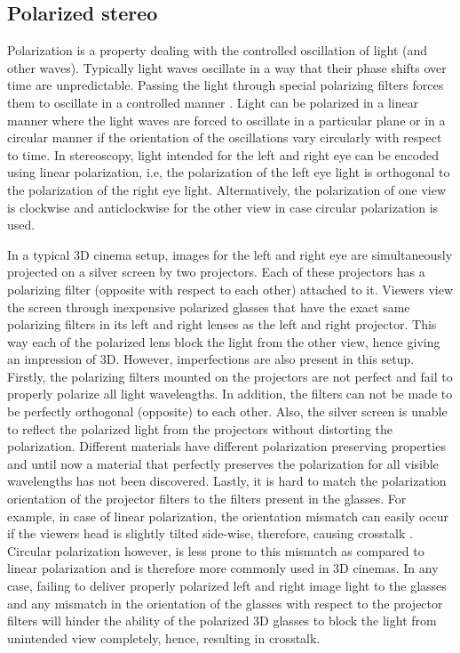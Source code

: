 \subsection{Polarized stereo}
Polarization is a property dealing with the controlled oscillation of light (and other waves). Typically light waves oscillate in a way that their phase shifts over time are unpredictable. Passing the light through special polarizing filters forces them to oscillate in a controlled manner \cite{ wiki:polarizationwiki}. Light can be polarized in a linear manner where the light waves are forced to oscillate in a particular plane or in a circular manner if the orientation of the oscillations vary circularly with respect to time. In stereoscopy, light intended for the left and right eye can be encoded using linear polarization, i.e, the polarization of the left eye light is orthogonal to the polarization of the right eye light. Alternatively, the polarization of one view is clockwise and anticlockwise for the other view in case circular polarization is used.

In a typical 3D cinema setup, images for the left and right eye are simultaneously projected on a silver screen by two projectors. Each of these projectors has a polarizing filter (opposite with respect to each other) attached to it. Viewers view the screen through inexpensive polarized glasses that have the exact same polarizing filters in its left and right lenses as the left and right projector. This way each of the polarized lens block the light from the other view, hence giving an impression of 3D. However, imperfections are also present in this setup. Firstly, the polarizing filters mounted on the projectors are not perfect and fail to properly polarize all light wavelengths. In addition, the filters can not be made to be perfectly orthogonal (opposite) to each other\cite{woods2012crosstalk}. Also, the silver screen is unable to reflect the polarized light from the projectors without distorting the polarization. Different materials have different polarization preserving properties and until now a material that perfectly preserves the polarization for all visible wavelengths has not been discovered. Lastly, it is hard to match the polarization orientation of the projector filters to the filters present in the glasses. For example, in case of linear polarization, the orientation mismatch can easily occur if the viewers head is slightly tilted side-wise, therefore, causing crosstalk \cite{hong2010analysis}. Circular polarization however, is less prone to this mismatch as compared to linear polarization and is therefore more commonly used in 3D cinemas. In any case, failing to deliver properly polarized left and right image light to the glasses and any mismatch in the orientation of the glasses with respect to the projector filters will hinder the ability of the polarized 3D glasses to block the light from unintended view completely, hence, resulting in crosstalk.

